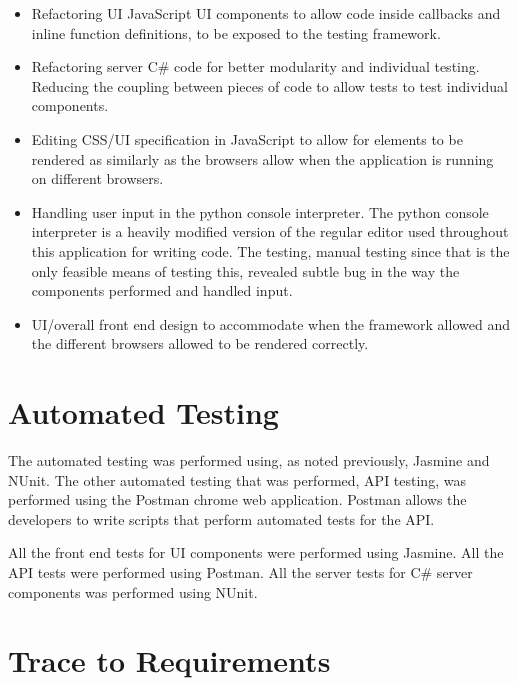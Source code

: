 \documentclass[12pt, titlepage]{article}
\begin{document}
\begin{itemize}
\item Refactoring UI JavaScript UI components to allow code inside callbacks
and inline function definitions, to be exposed to the testing framework.
\item Refactoring server C\# code for better modularity and individual testing.
Reducing the coupling between pieces of code to allow tests to test individual
components.
\item Editing CSS/UI specification in JavaScript to allow for elements to be
rendered as similarly as the browsers allow when the application is running on
different browsers.
\item Handling user input in the python console interpreter. The python console
interpreter is a heavily modified version of the regular editor used throughout
this application for writing code. The testing, manual testing since that
is the only feasible means of testing this, revealed subtle bug in the way
the components performed and handled input.
\item UI/overall front end design to accommodate when the framework allowed
and the different browsers allowed to be rendered correctly.
\end{itemize}

\section{Automated Testing}
The automated testing was performed using, as noted previously, Jasmine and
NUnit. The other automated testing that was performed, API testing, was
performed using the Postman chrome web application. Postman allows the developers
to write scripts that perform automated tests for the API.

All the front end tests for UI components were performed using Jasmine. All the
API tests were performed using Postman. All the server tests for C\# server
components was performed using NUnit.
		
\section{Trace to Requirements} \label{SecTM}
\end{document}
